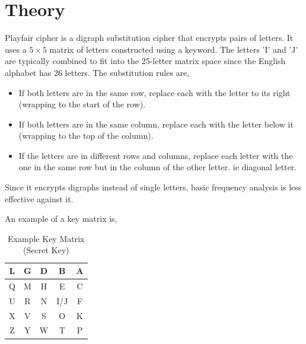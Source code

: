 
\section{Theory}
Playfair cipher is a digraph substitution cipher that encrypts pairs of letters. It uses a $5 \times 5$ matrix of letters constructed using a keyword. The letters 'I' and 'J' are typically combined to fit into the 25-letter matrix space since the English alphabet has 26 letters. The substitution rules are,
\begin{itemize}
  \item If both letters are in the same row, replace each with the letter to its right (wrapping to the start of the row).
  \item If both letters are in the same column, replace each with the letter below it (wrapping to the top of the column).
  \item If the letters are in different rows and columns, replace each letter with the one in the same row but in the column of the other letter. ie diagonal letter.
\end{itemize}

Since it encrypts digraphs instead of single letters, basic frequency analysis is less effective against it.

An example of a key matrix is,
\begin{table}[H]
  \centering
  \begin{tabular}{|c|c|c|c|c|}
    \hline
    L & G & D & B & A \\
    \hline
    Q & M & H & E & C \\
    \hline
    U & R & N & I/J & F \\
    \hline
    X & V & S & O & K \\
    \hline
    Z & Y & W & T & P \\
    \hline
  \end{tabular}
  \caption{Example Key Matrix (Secret Key)}
\end{table}


